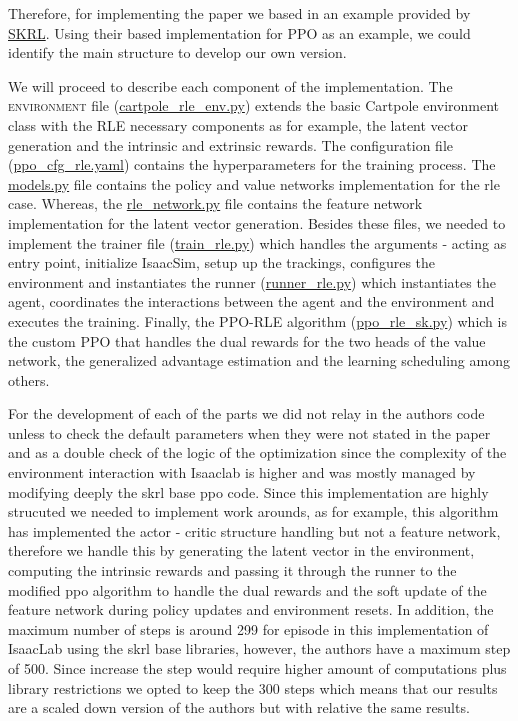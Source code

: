\documentclass[10pt]{article} %
\begin{document}
Therefore, for implementing the paper we based in an example provided by \href{https://skrl.readthedocs.io/en/latest/#}{SKRL}.
Using their based implementation for PPO as an example, we could identify the main structure to develop our own version. 

We will proceed to describe each component of the implementation. The \textsc{environment} file (\url{cartpole\_rle\_env.py}) extends the basic Cartpole environment class with the RLE necessary components as for example, 
the latent vector generation and the intrinsic and extrinsic rewards. The configuration file (\url{ppo\_cfg\_rle.yaml}) contains the hyperparameters for the training process. The \url{models.py} file contains the policy and value networks
implementation for the rle case. Whereas, the \url{rle\_network.py} file contains the feature network implementation for the latent vector generation. 
Besides these files, we needed to implement the trainer file (\url{train\_rle.py}) which handles the arguments - acting as entry point, initialize IsaacSim, setup up the trackings, configures the environment and 
instantiates the runner (\url{runner\_rle.py}) which instantiates the agent, coordinates the interactions between the agent and the environment and executes the training. Finally, the PPO-RLE algorithm (\url{ppo\_rle\_sk.py})
which is the custom PPO that handles the dual rewards for the two heads of the value network, the generalized advantage estimation and the learning scheduling among others. 

For the development of each of the parts we did not relay in the authors code unless to check the default parameters when they were not stated in the paper and as a double check of the logic of the optimization since the 
complexity of the environment interaction with Isaaclab is higher and was mostly managed by modifying deeply the skrl base ppo code. Since this implementation are highly strucuted we needed to implement work arounds, as for example,
this algorithm has implemented the actor - critic structure handling but not a feature network, therefore we handle this by generating the latent vector in the environment, computing the intrinsic rewards and passing it through the runner 
to the modified ppo algorithm to handle the dual rewards and the soft update of the feature network during policy updates and environment resets. In addition, the maximum number of steps is around 299 for episode in this implementation of
IsaacLab using the skrl base libraries, however, the authors have a maximum step of 500. Since increase the step would require higher amount of computations plus library restrictions we opted to keep the 300 steps which means that our results are
a scaled down version of the authors but with relative the same results. 
\end{document}
